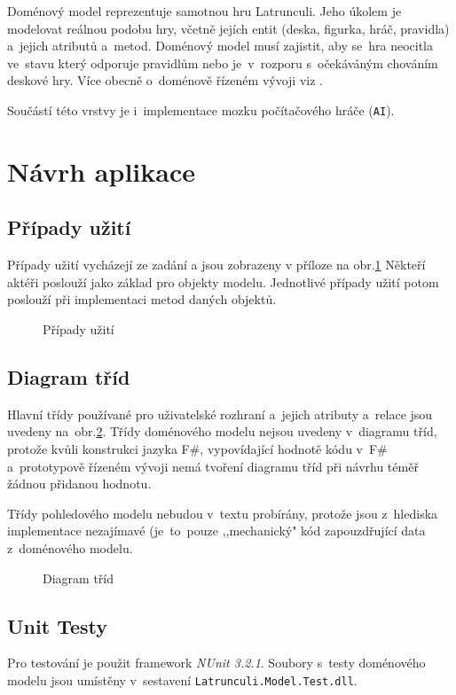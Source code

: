 \documentclass[12pt]{article}
\begin{document}
Doménový model reprezentuje samotnou hru Latrunculi. Jeho úkolem je modelovat reálnou podobu hry, včetně jejích entit (deska, figurka, hráč, pravidla) a~jejich atributů a~metod. Doménový model musí zajistit, aby se~hra neocitla ve~stavu který odporuje pravidlům nebo je~v~rozporu s~očekáváným chováním deskové hry. Více obecně o~doménově řízeném vývoji viz \cite{wlaschin2}.

Součástí této vrstvy je i~implementace mozku počítačového hráče (\texttt{AI}).

\section{Návrh aplikace}
\subsection{Případy užití}
Případy užití vycházejí ze zadání a jsou zobrazeny v příloze na obr.\ref{PrimaryUseCases} Někteří aktéři poslouží jako základ pro objekty modelu. Jednotlivé případy užití potom poslouží při implementaci metod daných objektů.

\begin{figure}[ht]
	\epsfysize=200mm
	\caption{Případy užití}
	\label{PrimaryUseCases}
\end{figure}

\subsection{Diagram tříd}
Hlavní třídy používané pro uživatelské rozhraní a~jejich atributy a~relace jsou uvedeny na~obr.\ref{UIClassDiagram}. Třídy doménového modelu nejsou uvedeny v~diagramu tříd, protože kvůli konstrukci jazyka F\#, vypovídající hodnotě kódu v~F\# a~prototypově řízeném vývoji nemá tvoření diagramu tříd při návrhu téměř žádnou přidanou hodnotu.

Třídy pohledového modelu nebudou v~textu probírány, protože jsou z~hlediska implementace nezajímavé (je~to~pouze ,,mechanický" kód  zapouzdřující data z~doménového modelu.

\begin{figure}[ht]
	\epsfysize=200mm
	\caption{Diagram tříd}
	\label{UIClassDiagram}
\end{figure}

\subsection{Unit Testy}
Pro testování je použit framework \emph{NUnit 3.2.1}. Soubory s~testy doménového modelu jsou umístěny v~sestavení \texttt{Latrunculi.Model.Test.dll}.
\end{document}
